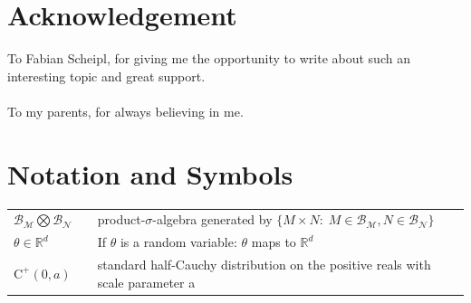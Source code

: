 \documentclass[12pt,letterpaper]{article}
\numberwithin{equation}{subsection}
\begin{document}
\newpage
\section*{Acknowledgement}
To Fabian Scheipl, for giving me the opportunity to write about such an interesting topic and great support. \\ \\
To my parents, for always believing in me.

\newpage
\setcounter{page}{1}
\tableofcontents
\newpage


\pagestyle{fancy}
\fancyhf{}
\fancyhead[R]{\thepage}
\renewcommand{\headrulewidth}{0pt} 
\section*{Notation and Symbols}

\begin{tabular}{lll}
$\mathcal{B}_\mathcal{M}\bigotimes\mathcal{B}_\mathcal{N}$ & & product-$\sigma$-algebra generated by $\{M\times N :\; M\in\mathcal{B}_\mathcal{M}, N\in\mathcal{B}_\mathcal{N} \}$ \\
$\theta \in \mathbb{R}^d$ & & If $\theta$ is a random variable: $\theta$ maps to $\mathbb{R}^d$ \\
$\text{C}^+(0,a)$ & & standard half-Cauchy distribution on the positive reals with scale parameter a
\end{tabular}

\pagebreak
\end{document}
